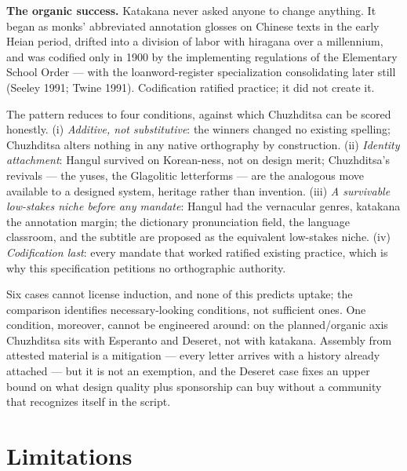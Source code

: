 \documentclass[11pt]{article}
\begin{document}
\textbf{The organic success.} Katakana never asked anyone to change anything. It began as monks' abbreviated annotation glosses on Chinese texts in the early Heian period, drifted into a division of labor with hiragana over a millennium, and was codified only in 1900 by the implementing regulations of the Elementary School Order — with the loanword-register specialization consolidating later still (Seeley 1991; Twine 1991). Codification ratified practice; it did not create it.

The pattern reduces to four conditions, against which Chuzhditsa can be scored honestly. (i) \emph{Additive, not substitutive}: the winners changed no existing spelling; Chuzhditsa alters nothing in any native orthography by construction. (ii) \emph{Identity attachment}: Hangul survived on Korean-ness, not on design merit; Chuzhditsa's revivals — the yuses, the Glagolitic letterforms — are the analogous move available to a designed system, heritage rather than invention. (iii) \emph{A survivable low-stakes niche before any mandate}: Hangul had the vernacular genres, katakana the annotation margin; the dictionary pronunciation field, the language classroom, and the subtitle are proposed as the equivalent low-stakes niche. (iv) \emph{Codification last}: every mandate that worked ratified existing practice, which is why this specification petitions no orthographic authority.

Six cases cannot license induction, and none of this predicts uptake; the comparison identifies necessary-looking conditions, not sufficient ones. One condition, moreover, cannot be engineered around: on the planned/organic axis Chuzhditsa sits with Esperanto and Deseret, not with katakana. Assembly from attested material is a mitigation — every letter arrives with a history already attached — but it is not an exemption, and the Deseret case fixes an upper bound on what design quality plus sponsorship can buy without a community that recognizes itself in the script.

\section{Limitations}\label{sec:limits}
\end{document}
